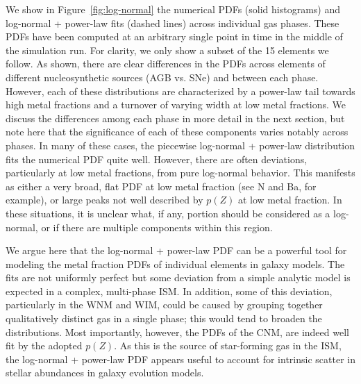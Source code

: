 We show in Figure~\ref{fig:log-normal} the numerical PDFs (solid histograms) and log-normal + power-law fits (dashed lines) across individual gas phases. These PDFs have been computed at an arbitrary single point in time in the middle of the simulation run.
For clarity, we only show a subset of the 15 elements we follow. As shown, there are clear differences in the PDFs across elements of different nucleosynthetic sources (AGB vs. SNe) and between each phase. However, each of these distributions are characterized by a power-law tail towards high metal fractions and a turnover of varying width at low metal fractions. We discuss the differences among each phase in more detail in the next section, but note here that the significance of each of these components varies notably across phases. In many of these cases, the piecewise log-normal + power-law distribution fits the numerical PDF quite well. However, there are often deviations, particularly at low metal fractions, from pure log-normal behavior. This manifests as either a very broad, flat PDF at low metal fraction (see N and Ba, for example), or large peaks not well described by $p(Z)$ at low metal fraction. In these situations, it is unclear what, if any, portion should be considered as a log-normal, or if there are multiple components within this region.

We argue here that the log-normal + power-law PDF can be a powerful tool for modeling the metal fraction  PDFs of individual elements in galaxy models. The fits are not uniformly perfect but some deviation from a simple analytic model is expected in a complex, multi-phase ISM. In addition, some of this deviation, particularly in the WNM and WIM, could be caused by grouping together qualitatively distinct gas in a single phase; this would tend to broaden the distributions. Most importantly, however, the PDFs of the CNM, are indeed well fit by the adopted $p(Z)$. As this is the source of star-forming gas in the ISM, the log-normal + power-law PDF appears useful to account for intrinsic scatter in stellar abundances in galaxy evolution models.

